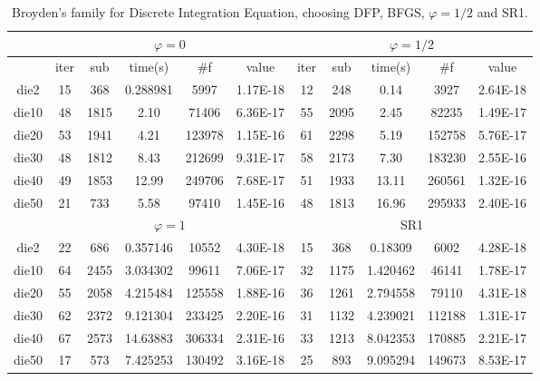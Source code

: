 \documentclass{article}
\begin{document}
\begin{table}[H]
	\centering
	\begin{tabular}{|c|c|c|c|c|c|c|c|c|c|c|}
		\hline
		& \multicolumn{5}{c|}{$\varphi = 0$}         & \multicolumn{5}{c|}{$\varphi = 1/2$}       \\ \hline
		& iter & sub  & time(s)  & \#f    & value    & iter & sub  & time(s)  & \#f    & value    \\ \hline
		die2  & 15   & 368  & 0.288981 & 5997   & 1.17E-18 & 12   & 248  & 0.14     & 3927   & 2.64E-18 \\ \hline
		die10 & 48   & 1815 & 2.10     & 71406  & 6.36E-17 & 55   & 2095 & 2.45     & 82235  & 1.49E-17 \\ \hline
		die20 & 53   & 1941 & 4.21     & 123978 & 1.15E-16 & 61   & 2298 & 5.19     & 152758 & 5.76E-17 \\ \hline
		die30 & 48   & 1812 & 8.43     & 212699 & 9.31E-17 & 58   & 2173 & 7.30     & 183230 & 2.55E-16 \\ \hline
		die40 & 49   & 1853 & 12.99    & 249706 & 7.68E-17 & 51   & 1933 & 13.11    & 260561 & 1.32E-16 \\ \hline
		die50 & 21   & 733  & 5.58     & 97410  & 1.45E-16 & 48   & 1813 & 16.96    & 295933 & 2.40E-16 \\ \hline
		& \multicolumn{5}{c|}{$\varphi = 1$}         & \multicolumn{5}{c|}{SR1}                   \\ \hline
		die2  & 22   & 686  & 0.357146 & 10552  & 4.30E-18 & 15   & 368  & 0.18309  & 6002   & 4.28E-18 \\ \hline
		die10 & 64   & 2455 & 3.034302 & 99611  & 7.06E-17 & 32   & 1175 & 1.420462 & 46141  & 1.78E-17 \\ \hline
		die20 & 55   & 2058 & 4.215484 & 125558 & 1.88E-16 & 36   & 1261 & 2.794558 & 79110  & 4.31E-18 \\ \hline
		die30 & 62   & 2372 & 9.121304 & 233425 & 2.20E-16 & 31   & 1132 & 4.239021 & 112188 & 1.31E-17 \\ \hline
		die40 & 67   & 2573 & 14.63883 & 306334 & 2.31E-16 & 33   & 1213 & 8.042353 & 170885 & 2.21E-17 \\ \hline
		die50 & 17   & 573  & 7.425253 & 130492 & 3.16E-18 & 25   & 893  & 9.095294 & 149673 & 8.53E-17 \\ \hline
	\end{tabular}
\caption{Broyden's family for Discrete Integration Equation, choosing DFP, BFGS, $\varphi = 1/2$ and SR1.}
\end{table}
\end{document}
